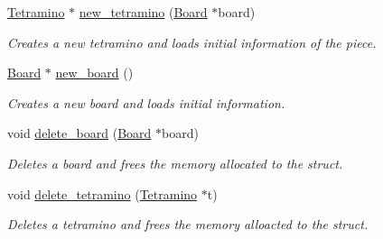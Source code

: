 \begin{DoxyCompactItemize}
\mbox{\hyperlink{struct_tetramino}{Tetramino}} $\ast$ \mbox{\hyperlink{group__tetramino_ga9a2309ca24e8dec1a1bf31a995db2de1}{new\+\_\+tetramino}} (\mbox{\hyperlink{struct_board}{Board}} $\ast$board)
\begin{DoxyCompactList}\small\item\em Creates a new tetramino and loads initial information of the piece. \end{DoxyCompactList}\item 
\mbox{\hyperlink{struct_board}{Board}} $\ast$ \mbox{\hyperlink{group__tetramino_ga3d4977293a2989f9483b897b1a5bd073}{new\+\_\+board}} ()
\begin{DoxyCompactList}\small\item\em Creates a new board and loads initial information. \end{DoxyCompactList}\item 
void \mbox{\hyperlink{group__tetramino_ga5ab138241d19c1826240ea803c970d9d}{delete\+\_\+board}} (\mbox{\hyperlink{struct_board}{Board}} $\ast$board)
\begin{DoxyCompactList}\small\item\em Deletes a board and frees the memory allocated to the struct. \end{DoxyCompactList}\item 
void \mbox{\hyperlink{group__tetramino_ga562ee8dcd3b145bafdf0311f1a3b7296}{delete\+\_\+tetramino}} (\mbox{\hyperlink{struct_tetramino}{Tetramino}} $\ast$t)
\begin{DoxyCompactList}\small\item\em Deletes a tetramino and frees the memory alloacted to the struct. \end{DoxyCompactList}\end{DoxyCompactItemize}
